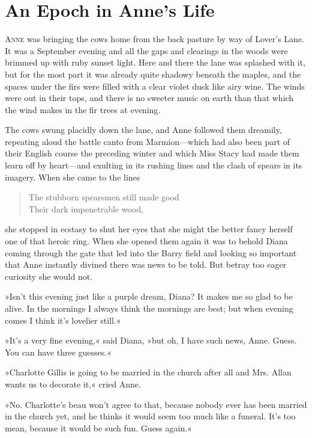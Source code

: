 \chapter{An Epoch in Anne's Life}

\lettrine[lines=4]{A}{nne} was bringing the cows home from the back pasture by way of Lover's Lane. It was a September evening and all the gaps and clearings in the woods were brimmed up with ruby sunset light. Here and there the lane was splashed with it, but for the most part it was already quite shadowy beneath the maples, and the spaces under the firs were filled with a clear violet dusk like airy wine. The winds were out in their tops, and there is no sweeter music on earth than that which the wind makes in the fir trees at evening.

The cows swung placidly down the lane, and Anne followed them dreamily, repeating aloud the battle canto from Marmion—which had also been part of their English course the preceding winter and which Miss Stacy had made them learn off by heart—and exulting in its rushing lines and the clash of spears in its imagery. When she came to the lines

\begin{verse}
The stubborn spearsmen still made good\\
Their dark impenetrable wood,\\
\end{verse}

she stopped in ecstasy to shut her eyes that she might the better fancy herself one of that heroic ring. When she opened them again it was to behold Diana coming through the gate that led into the Barry field and looking so important that Anne instantly divined there was news to be told. But betray too eager curiosity she would not.

»Isn't this evening just like a purple dream, Diana? It makes me so glad to be alive. In the mornings I always think the mornings are best; but when evening comes I think it's lovelier still.«

»It's a very fine evening,« said Diana, »but oh, I have such news, Anne. Guess. You can have three guesses.«

»Charlotte Gillis is going to be married in the church after all and Mrs. Allan wants us to decorate it,« cried Anne.

»No. Charlotte's beau won't agree to that, because nobody ever has been married in the church yet, and he thinks it would seem too much like a funeral. It's too mean, because it would be such fun. Guess again.«

